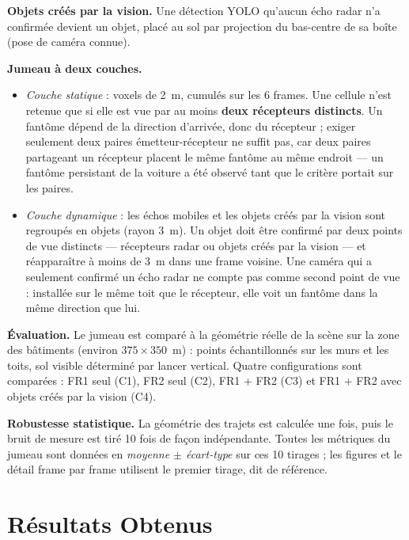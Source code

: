 \documentclass[12pt,a4paper,titlepage]{article}
\begin{document}
\textbf{Objets créés par la vision.} Une détection YOLO qu'aucun écho radar n'a confirmée devient un objet, placé au sol par projection du bas-centre de sa boîte (pose de caméra connue).

\textbf{Jumeau à deux couches.}
\begin{itemize}[leftmargin=1.5em]
    \item \emph{Couche statique} : voxels de 2~m, cumulés sur les 6 frames. Une cellule n'est retenue que si elle est vue par au moins \textbf{deux récepteurs distincts}. Un fantôme dépend de la direction d'arrivée, donc du récepteur ; exiger seulement deux paires émetteur-récepteur ne suffit pas, car deux paires partageant un récepteur placent le même fantôme au même endroit --- un fantôme persistant de la voiture a été observé tant que le critère portait sur les paires.
    \item \emph{Couche dynamique} : les échos mobiles et les objets créés par la vision sont regroupés en objets (rayon 3~m). Un objet doit être confirmé par deux points de vue distincts --- récepteurs radar ou objets créés par la vision --- et réapparaître à moins de 3~m dans une frame voisine. Une caméra qui a seulement confirmé un écho radar ne compte pas comme second point de vue : installée sur le même toit que le récepteur, elle voit un fantôme dans la même direction que lui.
\end{itemize}

\textbf{Évaluation.} Le jumeau est comparé à la géométrie réelle de la scène sur la zone des bâtiments (environ $375\times350$~m) : points échantillonnés sur les murs et les toits, sol visible déterminé par lancer vertical. Quatre configurations sont comparées : FR1 seul (C1), FR2 seul (C2), FR1 + FR2 (C3) et FR1 + FR2 avec objets créés par la vision (C4).

\textbf{Robustesse statistique.} La géométrie des trajets est calculée une fois, puis le bruit de mesure est tiré 10 fois de façon indépendante. Toutes les métriques du jumeau sont données en \emph{moyenne $\pm$ écart-type} sur ces 10 tirages ; les figures et le détail frame par frame utilisent le premier tirage, dit de référence.


\section{Résultats Obtenus}
\label{sec:resultats}
\end{document}
